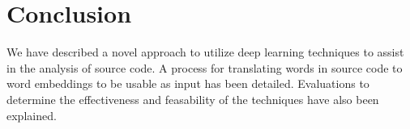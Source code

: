\section{Conclusion}

We have described a novel approach to utilize deep learning techniques to assist in the analysis of source code. A process for translating words in source code to word embeddings to be usable as input has been detailed. Evaluations to determine the effectiveness and feasability of the techniques have also been explained.
